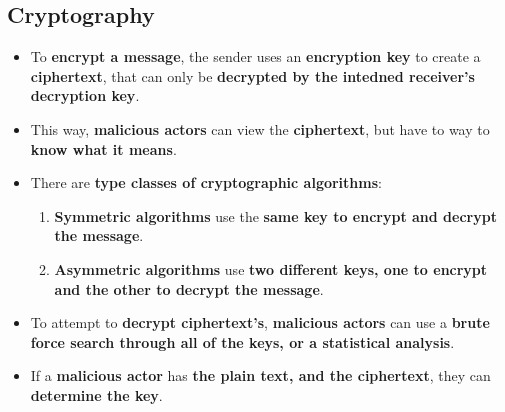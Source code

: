 \documentclass{article}
\begin{document}
    \subsection*{Cryptography}
    \begin{itemize}
        \item To \textbf{encrypt a message}, the sender uses an \textbf{encryption key} to create a \textbf{ciphertext}, that can only be \textbf{decrypted by the intedned receiver's decryption key}.
        \item This way, \textbf{malicious actors} can view the \textbf{ciphertext}, but have to way to \textbf{know what it means}.
        \item There are \textbf{type classes of cryptographic algorithms}:
        \begin{enumerate}
            \item \textbf{Symmetric algorithms} use the \textbf{same key to encrypt and decrypt the message}.
            \item \textbf{Asymmetric algorithms} use \textbf{two different keys, one to encrypt and the other to decrypt the message}.
        \end{enumerate}
        \item To attempt to \textbf{decrypt ciphertext's}, \textbf{malicious actors} can use a \textbf{brute force search through all of the keys, or a statistical analysis}.
        \item If a \textbf{malicious actor} has \textbf{the plain text, and the ciphertext}, they can \textbf{determine the key}.
    \end{itemize}
\end{document}
